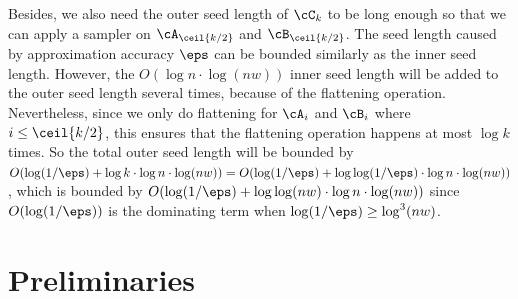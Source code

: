 Besides, we also need the outer seed length of $\cC_k$ to be long enough so that we can apply a sampler on $\cA_{\ceil{k/2}}$ and $\cB_{\ceil{k/2}}$. The seed length caused by approximation accuracy $\eps$ can be bounded similarly as the inner seed length. However, the $O(\log n\cdot \log (nw))$ inner seed length will be added to the outer seed length several times, because of the flattening operation. Nevertheless, since we only do flattening for $\cA_{i}$ and $\cB_{i}$ where $i\le \ceil{k/2}$, this ensures that the flattening operation happens at most $\log k$ times. So the total outer seed length will be bounded by $O(\log(1/\eps)+\log k\cdot \log n\cdot \log (nw))=O(\log(1/\eps)+\log \log(1/\eps)\cdot \log n\cdot \log (nw))$, which is bounded by $O(\log(1/\eps)+\log \log(nw)\cdot \log n\cdot \log (nw))$ since $O(\log(1/\eps))$ is the dominating term when $\log(1/\eps)\ge\log^3(nw)$.


\section{Preliminaries}\label{sec:prelim}
